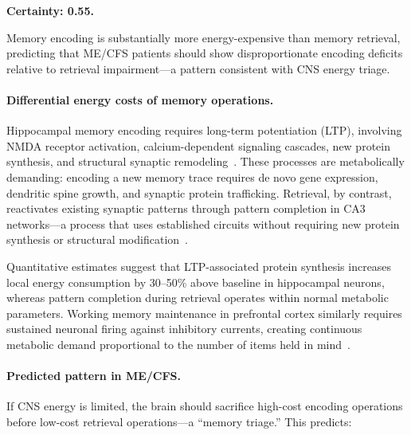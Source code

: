 \begin{hypothesis}
\label{hyp:memory-triage-consequence}
\textbf{Certainty: 0.55.}

Memory encoding is substantially more energy-expensive than memory retrieval, predicting that ME/CFS patients should show disproportionate encoding deficits relative to retrieval impairment---a pattern consistent with CNS energy triage.

\paragraph{Differential energy costs of memory operations.}
Hippocampal memory encoding requires long-term potentiation (LTP), involving NMDA receptor activation, calcium-dependent signaling cascades, new protein synthesis, and structural synaptic remodeling~\cite{Kandel2014memory}. These processes are metabolically demanding: encoding a new memory trace requires de novo gene expression, dendritic spine growth, and synaptic protein trafficking. Retrieval, by contrast, reactivates existing synaptic patterns through pattern completion in CA3 networks---a process that uses established circuits without requiring new protein synthesis or structural modification~\cite{Dudai2015consolidation}.

Quantitative estimates suggest that LTP-associated protein synthesis increases local energy consumption by 30--50\% above baseline in hippocampal neurons, whereas pattern completion during retrieval operates within normal metabolic parameters. Working memory maintenance in prefrontal cortex similarly requires sustained neuronal firing against inhibitory currents, creating continuous metabolic demand proportional to the number of items held in mind~\cite{Constantinidis2018working}.

\paragraph{Predicted pattern in ME/CFS.}
If CNS energy is limited, the brain should sacrifice high-cost encoding operations before low-cost retrieval operations---a ``memory triage.'' This predicts:


\end{hypothesis}
